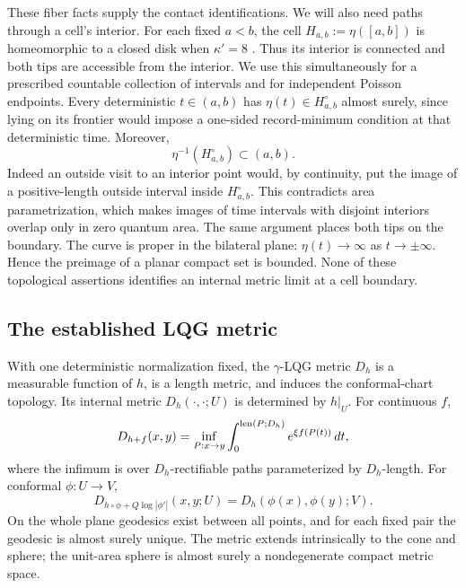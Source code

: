 These fiber facts supply the contact identifications. We will also
need paths through a cell's interior. For each fixed $a<b$, the
cell $H_{a,b}:=\eta([a,b])$ is
homeomorphic to a closed disk when $\kappa'=8$
\cite[Section~4.1.2]{DingGwynneDimension}. Thus its interior is connected
and both tips are accessible from the interior. We use this
simultaneously for a prescribed countable collection of
intervals and for independent Poisson endpoints. Every
deterministic $t\in(a,b)$ has $\eta(t)\in H_{a,b}^{\circ}$
almost surely, since lying on its frontier would impose a
one-sided record-minimum condition at that deterministic time.
Moreover,
\begin{equation}\label{tree:eq:cell_interior_preimages}
 \eta^{-1}(H_{a,b}^{\circ})\subset(a,b).
\end{equation}
Indeed an outside visit to an interior point would, by
continuity, put the image of a positive-length outside interval
inside $H_{a,b}^{\circ}$. This contradicts area parametrization,
which makes images of time intervals with disjoint interiors
overlap only in zero quantum area. The same argument places
both tips on the boundary. The curve is proper in the bilateral
plane: $\eta(t)\to\infty$ as $t\to\pm\infty$. Hence the
preimage of a planar compact set is bounded. None of these
topological assertions identifies an internal metric limit at
a cell boundary.

\subsection{The established LQG metric}

\begin{theorem}
\label{tree:thm:background_metric}
With one deterministic normalization fixed, the $\gamma$-LQG
metric $D_h$ is a measurable function of $h$, is a length metric,
and induces the conformal-chart topology. Its internal metric
$D_h(\cdot,\cdot;U)$ is determined by $h|_U$. For continuous $f$,
\begin{equation}\label{tree:eq:metric_weyl}
 D_{h+f}(x,y)=\inf_{P:x\to y}
   \int_0^{\operatorname{len}(P;D_h)}e^{\xi f(P(t))}\,dt,
\end{equation}
where the infimum is over $D_h$-rectifiable paths parameterized
by $D_h$-length. For conformal \mbox{$\phi:U\to V$},
\begin{equation}\label{tree:eq:metric_covariance}
 D_{h\circ\phi+Q\log|\phi'|}(x,y;U)
 =D_h(\phi(x),\phi(y);V).
\end{equation}
On the whole plane geodesics exist between all points, and for
each fixed pair the geodesic is almost surely unique. The metric
extends intrinsically to the cone and sphere; the unit-area
sphere is almost surely a nondegenerate compact metric space.
\end{theorem}

